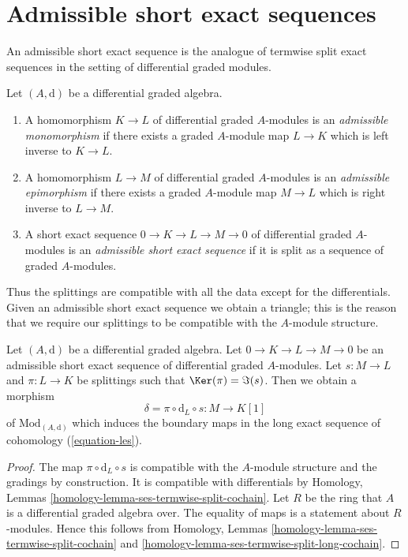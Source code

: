 \section{Admissible short exact sequences}
\label{section-admissible}

\noindent
An admissible short exact sequence is the analogue of termwise split exact
sequences in the setting of differential graded modules.

\begin{definition}
\label{definition-admissible-ses}
Let $(A, \text{d})$ be a differential graded algebra.
\begin{enumerate}
\item A homomorphism $K \to L$ of differential graded $A$-modules
is an {\it admissible monomorphism} if there exists a graded $A$-module
map $L \to K$ which is left inverse to $K \to L$.
\item A homomorphism $L \to M$ of differential graded $A$-modules
is an {\it admissible epimorphism} if there exists a graded $A$-module
map $M \to L$ which is right inverse to $L \to M$.
\item A short exact sequence $0 \to K \to L \to M \to 0$ of differential
graded $A$-modules is an {\it admissible short exact sequence}
if it is split as a sequence of graded $A$-modules.
\end{enumerate}
\end{definition}

\noindent
Thus the splittings are compatible with all the data except for
the differentials. Given an admissible short exact sequence we
obtain a triangle; this is the reason that we require our splittings
to be compatible with the $A$-module structure.

\begin{lemma}
\label{lemma-admissible-ses}
Let $(A, \text{d})$ be a differential graded algebra.
Let $0 \to K \to L \to M \to 0$ be an admissible short exact sequence
of differential graded $A$-modules. Let $s : M \to L$ and $\pi : L \to K$
be splittings such that $\Ker(\pi) = \Im(s)$.
Then we obtain a morphism
$$
\delta = \pi \circ \text{d}_L \circ s : M \to K[1]
$$
of $\text{Mod}_{(A, \text{d})}$ which induces the boundary maps
in the long exact sequence of cohomology (\ref{equation-les}).
\end{lemma}

\begin{proof}
The map $\pi \circ \text{d}_L \circ s$ is compatible with the $A$-module
structure and the gradings by construction. It is compatible with
differentials by Homology, Lemmas
\ref{homology-lemma-ses-termwise-split-cochain}.
Let $R$ be the ring that $A$ is a differential graded algebra over.
The equality of maps is a statement about $R$-modules. Hence this
follows from Homology, Lemmas
\ref{homology-lemma-ses-termwise-split-cochain} and
\ref{homology-lemma-ses-termwise-split-long-cochain}.
\end{proof}


